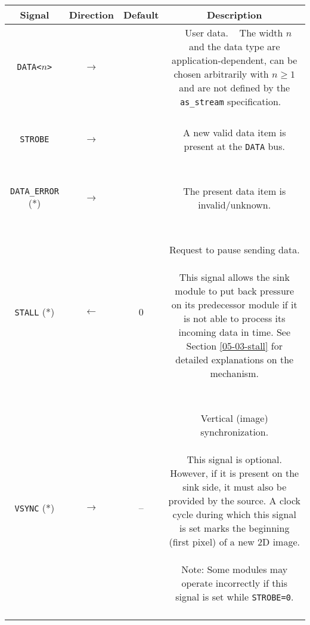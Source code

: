 \begin{longtable}[ht]{|c|c|c|c|}
\hline 
\textbf{Signal} & \textbf{Direction} & \textbf{Default} & \textbf{Description} \\
\hline 
\hline 
\endhead

\texttt{DATA<$n$>} & $\rightarrow$ &  &
\parbox{7cm}{ ~ \\ User data. \\ ~ \\ \small
The width $n$ and the data type are application-dependent, can be chosen arbitrarily with $n \geq 1$ and are not defined by the \texttt{as\_stream} specification.
\\ ~ } \\

\hline 

\texttt{STROBE} & $\rightarrow$ & &
\parbox{7cm}{ ~ \\ A new valid data item is present at the \texttt{DATA} bus.
\\ ~ } \\

\hline 

\texttt{DATA\_ERROR} (*) & $\rightarrow$ & &
\parbox{7cm}{~ \\ The present data item is invalid/unknown.
\\ ~ } \\

\hline 

\texttt{STALL} (*) & $\leftarrow$ & 0 &
\parbox{7cm}{~ \\ Request to pause sending data. \\ ~ \\ \small
This signal allows the sink module to put back pressure on its predecessor module if it is not able to process its incoming data in time. See Section \ref{05-03-stall} for detailed explanations on the mechanism.
\\ ~ } \\

\hline 

\texttt{VSYNC} (*) & $\rightarrow$ & -- &
\parbox{7cm}{~ \\ Vertical (image) synchronization. \\ ~ \\ \small
This signal is optional. However, if it is present on the sink side, it must also be provided by the source. A clock cycle during which this signal is set marks the beginning (first pixel) of a new 2D image. \\ ~ \\
Note: Some modules may operate incorrectly if this signal is set while \texttt{STROBE=0}.
\\ ~ } \\


\end{longtable}
